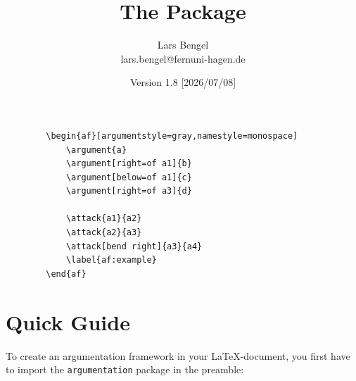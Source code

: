 \documentclass{scrartcl}
\title{The \argumentation Package}
\author{Lars Bengel\footnotemark\\\small lars.bengel@fernuni-hagen.de}
\date{Version 1.8 [2026/07/08]}
\newcommand{\argumentation}{\texttt{argumentation}\xspace}
\begin{document}
\maketitle

\renewcommand*{\thefootnote}{\fnsymbol{footnote}}
\renewcommand*{\thefootnote}{\arabic{footnote}}

\begin{minipage}{.26\textwidth}
    \centering
        \begin{af}[argumentstyle=gray,namestyle=monospace]
    
            \label{af:example}
        \end{af}
\end{minipage}
\begin{minipage}{.5\textwidth}
    \begin{small}
    \begin{verbatim}
        \begin{af}[argumentstyle=gray,namestyle=monospace]
            \argument{a}
            \argument[right=of a1]{b}
            \argument[below=of a1]{c}
            \argument[right=of a3]{d}
    
            \attack{a1}{a2}
            \attack{a2}{a3}
            \attack[bend right]{a3}{a4}
            \label{af:example}
        \end{af}
    \end{verbatim}
    \end{small}
\end{minipage}

\tableofcontents

\newpage

\section{Quick Guide}\label{sec:quick}
\noindent
To create an argumentation framework in your \LaTeX-document, you first have to import the \argumentation package in the preamble:\\
\end{document}
